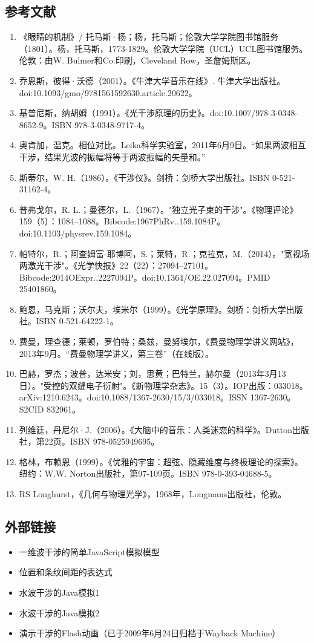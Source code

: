 \subsection{参考文献}
\begin{enumerate}
\item 《眼睛的机制》/ 托马斯·杨；杨，托马斯；伦敦大学学院图书馆服务（1801）。杨，托马斯，1773-1829。伦敦大学学院（UCL）UCL图书馆服务。伦敦：由W. Bulmer和Co.印刷，Cleveland Row，圣詹姆斯区。
\item 乔恩斯，彼得·沃德（2001）。《牛津大学音乐在线》. 牛津大学出版社。doi:10.1093/gmo/9781561592630.article.20622。
\item 基普尼斯，纳胡姆（1991）。《光干涉原理的历史》。doi:10.1007/978-3-0348-8652-9。ISBN 978-3-0348-9717-4。
\item 奥肯加，温克。相位对比。Leika科学实验室，2011年6月9日。“如果两波相互干涉，结果光波的振幅将等于两波振幅的矢量和。”
\item 斯蒂尔，W. H.（1986）。《干涉仪》。剑桥：剑桥大学出版社。ISBN 0-521-31162-4。
\item 普弗戈尔，R. L.；曼德尔，L.（1967）。"独立光子束的干涉"。《物理评论》159（5）：1084–1088。Bibcode:1967PhRv..159.1084P。doi:10.1103/physrev.159.1084。
\item 帕特尔，R.；阿查姆富-耶博阿，S.；莱特，R.；克拉克，M.（2014）。"宽视场两激光干涉"。《光学快报》22（22）：27094–27101。Bibcode:2014OExpr..2227094P。doi:10.1364/OE.22.027094。PMID 25401860。
\item 鲍恩，马克斯；沃尔夫，埃米尔（1999）。《光学原理》。剑桥：剑桥大学出版社。ISBN 0-521-64222-1。
\item 费曼，理查德；莱顿，罗伯特；桑兹，曼努埃尔，《费曼物理学讲义网站》，2013年9月。“费曼物理学讲义，第三卷”（在线版）。
\item 巴赫，罗杰；波普，达米安；刘，思黄；巴特兰，赫尔曼（2013年3月13日）。"受控的双缝电子衍射"。《新物理学杂志》。15（3）。IOP出版：033018。arXiv:1210.6243。doi:10.1088/1367-2630/15/3/033018。ISSN 1367-2630。S2CID 832961。
\item 列维廷，丹尼尔·J.（2006）。《大脑中的音乐：人类迷恋的科学》。Dutton出版社，第22页。ISBN 978-0525949695。
\item 格林，布赖恩（1999）。《优雅的宇宙：超弦、隐藏维度与终极理论的探索》。纽约：W.W. Norton出版社，第97-109页。ISBN 978-0-393-04688-5。
\item RS Longhurst，《几何与物理光学》，1968年，Longmans出版社，伦敦。
\end{enumerate}
\subsection{外部链接}
\begin{itemize}
\item 一维波干涉的简单JavaScript模拟模型
\item 位置和条纹间距的表达式
\item 水波干涉的Java模拟1
\item 水波干涉的Java模拟2
\item 演示干涉的Flash动画（已于2009年6月24日归档于Wayback Machine）
\end{itemize}